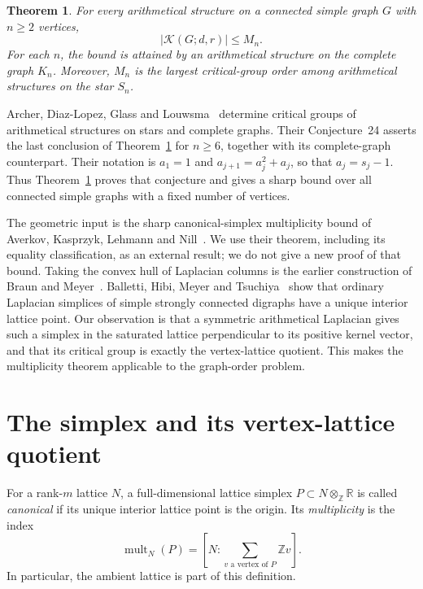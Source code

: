 \documentclass[11pt]{article}
\newtheorem{theorem}{Theorem}
\theoremstyle{remark}
\newcommand{\Z}{\mathbb Z}
\newcommand{\R}{\mathbb R}
\newcommand{\K}{\mathcal K}
\begin{document}
\begin{theorem}\label{thm:main}
For every arithmetical structure on a connected simple graph $G$ with $n\geq2$ vertices,
\[
 |\K(G;d,r)|\leq M_n.
\]
For each $n$, the bound is attained by an arithmetical structure on the complete graph $K_n$. Moreover, $M_n$ is the largest critical-group order among arithmetical structures on the star $S_n$.
\end{theorem}

Archer, Diaz-Lopez, Glass and Louwsma~\cite{ADGL} determine critical groups of arithmetical structures on stars and complete graphs. Their Conjecture~24 asserts the last conclusion of Theorem~\ref{thm:main} for $n\geq6$, together with its complete-graph counterpart. Their notation is $a_1=1$ and $a_{j+1}=a_j^2+a_j$, so that $a_j=s_j-1$. Thus Theorem~\ref{thm:main} proves that conjecture and gives a sharp bound over all connected simple graphs with a fixed number of vertices.

The geometric input is the sharp canonical-simplex multiplicity bound of Averkov, Kasprzyk, Lehmann and Nill~\cite{AKLN}. We use their theorem, including its equality classification, as an external result; we do not give a new proof of that bound. Taking the convex hull of Laplacian columns is the earlier construction of Braun and Meyer~\cite{BM}. Balletti, Hibi, Meyer and Tsuchiya~\cite{BHMT} show that ordinary Laplacian simplices of simple strongly connected digraphs have a unique interior lattice point. Our observation is that a symmetric arithmetical Laplacian gives such a simplex in the saturated lattice perpendicular to its positive kernel vector, and that its critical group is exactly the vertex-lattice quotient. This makes the multiplicity theorem applicable to the graph-order problem.

\section{The simplex and its vertex-lattice quotient}

For a rank-$m$ lattice $N$, a full-dimensional lattice simplex $P\subset N\otimes_\Z\R$ is called \emph{canonical} if its unique interior lattice point is the origin. Its \emph{multiplicity} is the index
\[
 \operatorname{mult}_N(P)
 =\left[N:\sum_{v\text{ a vertex of }P}\Z v\right].
\]
In particular, the ambient lattice is part of this definition.
\end{document}
